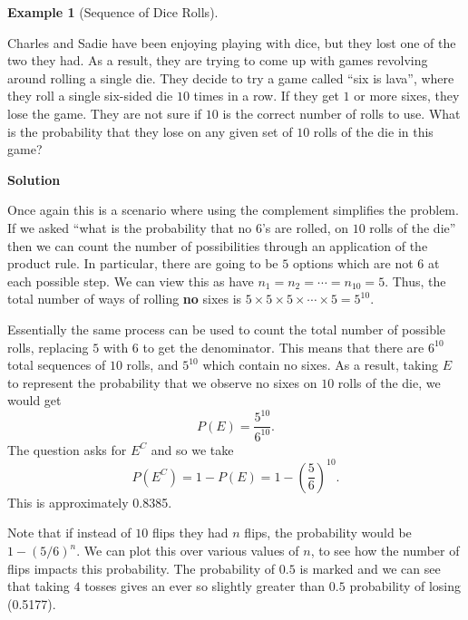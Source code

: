 \documentclass[
  letterpaper,
  DIV=11,
  numbers=noendperiod]{scrreprt}
\theoremstyle{definition}
\theoremstyle{definition}
\theoremstyle{definition}
\newtheorem{example}{Example}[chapter]
\theoremstyle{remark}
\begin{document}
\begin{example}[Sequence of Dice
Rolls]\protect\hypertarget{exm-rolling-sequence-of-dice}{}\label{exm-rolling-sequence-of-dice}

Charles and Sadie have been enjoying playing with dice, but they lost
one of the two they had. As a result, they are trying to come up with
games revolving around rolling a single die. They decide to try a game
called ``six is lava'', where they roll a single six-sided die \(10\)
times in a row. If they get \(1\) or more sixes, they lose the game.
They are not sure if \(10\) is the correct number of rolls to use. What
is the probability that they lose on any given set of \(10\) rolls of
the die in this game?

\begin{tcolorbox}[enhanced jigsaw, colback=white, breakable, rightrule=.15mm, leftrule=.75mm, toprule=.15mm, left=2mm, arc=.35mm, opacityback=0, bottomrule=.15mm]

\vspace{-3mm}\textbf{Solution}\vspace{3mm}

Once again this is a scenario where using the complement simplifies the
problem. If we asked ``what is the probability that no 6's are rolled,
on \(10\) rolls of the die'' then we can count the number of
possibilities through an application of the product rule. In particular,
there are going to be \(5\) options which are not \(6\) at each possible
step. We can view this as have \(n_1 = n_2 = \cdots = n_{10} = 5\).
Thus, the total number of ways of rolling \textbf{no} sixes is
\(5\times5\times5\times\cdots\times5 = 5^{10}\).

Essentially the same process can be used to count the total number of
possible rolls, replacing \(5\) with \(6\) to get the denominator. This
means that there are \(6^{10}\) total sequences of \(10\) rolls, and
\(5^{10}\) which contain no sixes. As a result, taking \(E\) to
represent the probability that we observe no sixes on \(10\) rolls of
the die, we would get \[P(E) = \frac{5^{10}}{6^{10}}.\] The question
asks for \(E^C\) and so we take
\[P(E^C) = 1 - P(E) = 1 - \left(\frac{5}{6}\right)^{10}.\] This is
approximately 0.8385.

Note that if instead of \(10\) flips they had \(n\) flips, the
probability would be \(1 - \left(5/6\right)^n\). We can plot this over
various values of \(n\), to see how the number of flips impacts this
probability. The probability of \(0.5\) is marked and we can see that
taking \(4\) tosses gives an ever so slightly greater than \(0.5\)
probability of losing (0.5177).


\end{tcolorbox}
\end{example}
\end{document}
